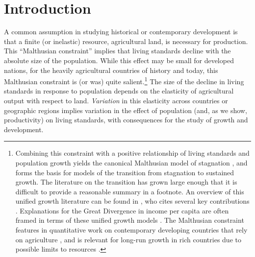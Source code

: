 \documentclass[11pt]{article}
\begin{document}
\pagebreak 

\section{Introduction}
\onehalfspacing 
A common assumption in studying historical or contemporary development is that a finite (or inelastic) resource, agricultural land, is necessary for production. This ``Malthusian constraint'' implies that living standards decline with the absolute size of the population. While this effect may be small for developed nations, for the heavily agricultural countries of history and today, this Malthusian constraint is (or was) quite salient.\footnote{Combining this constraint with a positive relationship of living standards and population growth yields the canonical Malthusian model of stagnation \citep{ashraf2010dynamics}, and forms the basis for models of the transition from stagnation to sustained growth. The literature on the transition has grown large enough that it is difficult to provide a reasonable summary in a footnote. An overview of this unified growth literature can be found in \citet{Galor:2011uq}, who cites several key contributions \citep{gw00,galor2002natural,Hansen:2002fk,doepke2004accounting,cs2005,lagerlof2006,craftsmills2009,strulik2008population}. Explanations for the Great Divergence in income per capita are often framed in terms of these unified growth models \citep{kp2001,galor2008trading,vollrath2011,vv08,vv13,cs2015}. The Malthusian constraint features in quantitative work on contemporary developing countries that rely on agriculture \citep{Gollin:2007oq,Restuccia:2008hc,weilwilde2009,Gollin:2010ys,ev2016clim}, and is relevant for long-run growth in rich countries due to possible limits to resources \citep{perettovalente2015}.} The size of the decline in living standards in response to population depends on the elasticity of agricultural output with respect to land. \textit{Variation} in this elasticity across countries or geographic regions implies variation in the effect of population (and, as we show, productivity) on living standards, with consequences for the study of growth and development. 
\end{document}
